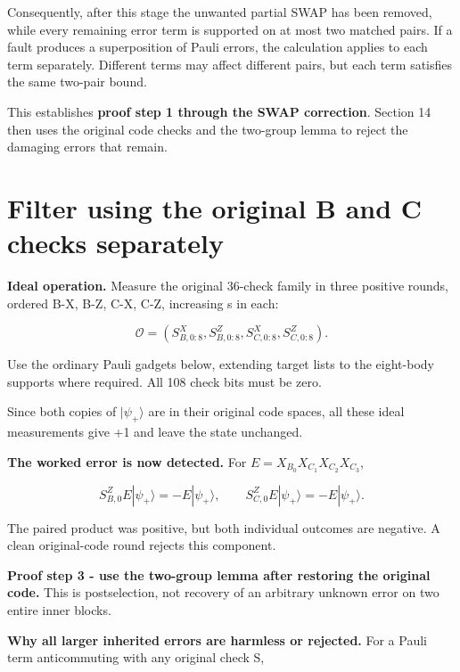 \documentclass[11pt]{article}
\begin{document}
Consequently, after this stage the unwanted partial SWAP has been removed, while every remaining error term is supported on at most two matched pairs. If a fault produces a superposition of Pauli errors, the calculation applies to each term separately. Different terms may affect different pairs, but each term satisfies the same two-pair bound.

This establishes \textbf{proof step 1 through the SWAP correction}. Section 14 then uses the original code checks and the two-group lemma to reject the damaging errors that remain.

\section{Filter using the original B and C checks separately}
\textbf{Ideal operation.} Measure the original 36-check family in three positive rounds, ordered B-X, B-Z, C-X, C-Z, increasing s in each:

\[
\mathcal O=(S^X_{B,0:8},S^Z_{B,0:8},S^X_{C,0:8},S^Z_{C,0:8}).
\]

Use the ordinary Pauli gadgets below, extending target lists to the eight-body supports where required. All 108 check bits must be zero.

\begin{center}\begin{minipage}{\linewidth}

\end{minipage}\end{center}

Since both copies of \(|\psi_+\rangle\) are in their original code spaces, all these ideal measurements give +1 and leave the state unchanged.

\textbf{The worked error is now detected.} For \(E=X_{B_0}X_{C_1}X_{C_2}X_{C_3}\),

\[
S^Z_{B,0}E|\psi_+\rangle=-E|\psi_+\rangle,\qquad
S^Z_{C,0}E|\psi_+\rangle=-E|\psi_+\rangle.
\]

The paired product was positive, but both individual outcomes are negative. A clean original-code round rejects this component.

\textbf{Proof step 3 - use the two-group lemma after restoring the original code.} This is postselection, not recovery of an arbitrary unknown error on two entire inner blocks.

\textbf{Why all larger inherited errors are harmless or rejected.} For a Pauli term anticommuting with any original check S,
\end{document}
